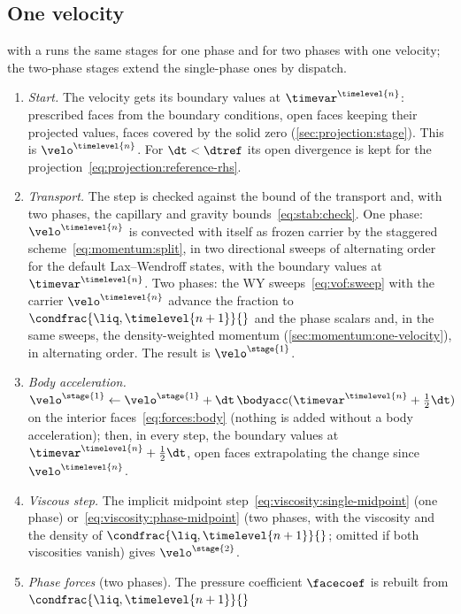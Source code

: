 \subsection{One velocity}\label{sec:overview:step-one}
 with a  runs the same stages for one
phase and for two phases with one velocity; the two-phase stages extend the
single-phase ones by dispatch.
\begin{enumerate}
\item \emph{Start.} The velocity gets its boundary values at
  $\timevar^{\timelevel{n}}$: prescribed faces from the boundary conditions,
  open faces keeping their projected values, faces covered by the solid zero
  (\cref{sec:projection:stage}). This is $\velo^{\timelevel{n}}$. For
  $\dt<\dtref$ its open divergence is kept for the
  projection~\cref{eq:projection:reference-rhs}.
\item \emph{Transport.} The step is checked against the bound of the
  transport and, with two phases, the capillary and gravity
  bounds~\cref{eq:stab:check}. One phase: $\velo^{\timelevel{n}}$ is
  convected with itself as frozen carrier by the staggered
  scheme~\cref{eq:momentum:split}, in two directional sweeps of alternating
  order for the default Lax--Wendroff states, with the boundary values at
  $\timevar^{\timelevel{n}}$. Two phases: the WY
  sweeps~\cref{eq:vof:sweep} with the carrier $\velo^{\timelevel{n}}$
  advance the fraction to $\condfrac{\liq,\timelevel{n+1}}{}$ and the phase
  scalars and, in the same sweeps, the density-weighted momentum
  (\cref{sec:momentum:one-velocity}), in alternating order. The result is
  $\velo^{\stage{1}}$.
\item \emph{Body acceleration.}
  $\velo^{\stage{1}}\leftarrow\velo^{\stage{1}}+\dt\,\bodyacc(\timevar^{\timelevel{n}}+\half\dt)$
  on the interior faces~\cref{eq:forces:body} (nothing is added without a body
  acceleration); then, in every step, the boundary values at
  $\timevar^{\timelevel{n}}+\half\dt$, open faces extrapolating the change
  since $\velo^{\timelevel{n}}$.
\item \emph{Viscous step.} The implicit midpoint
  step~\cref{eq:viscosity:single-midpoint} (one phase)
  or~\cref{eq:viscosity:phase-midpoint} (two phases, with the viscosity and
  the density of $\condfrac{\liq,\timelevel{n+1}}{}$; omitted if both
  viscosities vanish) gives $\velo^{\stage{2}}$.
\item \emph{Phase forces} (two phases). The pressure coefficient
  $\facecoef$ is rebuilt from $\condfrac{\liq,\timelevel{n+1}}{}$

\end{enumerate}
